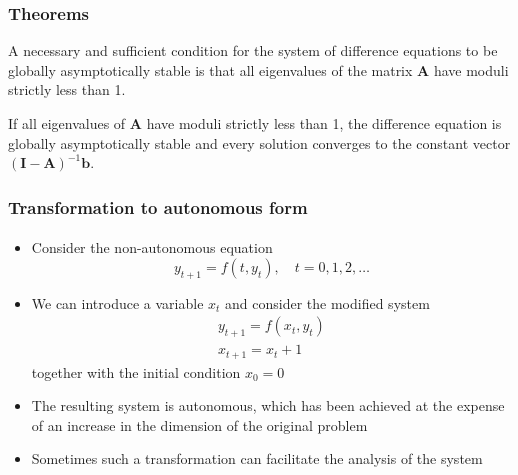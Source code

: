 \documentclass[10pt,usenames,dvipsnames]{beamer}
\theoremstyle{definition}
\begin{document}
\begin{frame}[fragile]
\frametitle{Theorems}
\begin{theorem}
	A necessary and sufficient condition for the system of difference equations to be globally asymptotically stable is that all eigenvalues of the matrix $\mathbf{A}$ have moduli strictly less than 1.
\end{theorem}

\begin{theorem}
	If all eigenvalues of $\mathbf{A}$ have moduli strictly less than 1, the difference equation is globally asymptotically stable and every solution converges to the constant vector $\mathbf{(I - A)}^{-1}\mathbf{b}$.
\end{theorem}
\end{frame}


\begin{frame}
	\frametitle{Transformation to autonomous form}
	\framesubtitle{}
		\begin{itemize}\itemsep1em
		\item Consider the non-autonomous equation \[ y_{t+1} = f(t, y_{t}), \quad t = 0, 1, 2, \ldots \]
		\item We can introduce a variable $ x_t $ and consider the modified system 
			\[
		\begin{array}{l}
			y_{t+1} = f(x_t, y_t)\\
			x_{t+1} = x_t + 1
		\end{array}
		\] together with the initial condition $ x_0=0 $
		\item The resulting system is autonomous, which has been achieved at the expense of an increase in the dimension of the original problem
		\item Sometimes such a transformation can facilitate the analysis of the system 
	\end{itemize}
\end{frame}
\end{document}
